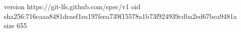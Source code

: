 version https://git-lfs.github.com/spec/v1
oid sha256:716caaa8481deaef1ea197feea739f15578a1b73f924939cdba2ed67bca9481a
size 655
